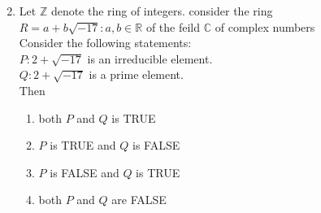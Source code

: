 \documentclass[journal]{IEEEtran}
\begin{document}
\begin{enumerate}
\begin{equation}
\end{equation}
\item Let $\mathbb{Z}$ denote the ring of integers. consider the ring\\
$R={a+b\sqrt{-17}: a,b \in \mathbb{R}}$ of the feild $\mathbb{C}$ of complex numbers \\
Consider the following statements:\\
$P:2+\sqrt{-17}$ is an irreducible element.\\
$Q:2+\sqrt{-17}$ is a prime element.\\
Then
\begin{enumerate}
    \item both $P$ and $Q$ is TRUE
    \item $P$ is TRUE and $Q$ is FALSE
    \item $P$ is FALSE and $Q$ is TRUE
    \item both $P$ and $Q$ are FALSE
\end{enumerate}
\end{enumerate}
\end{document}
